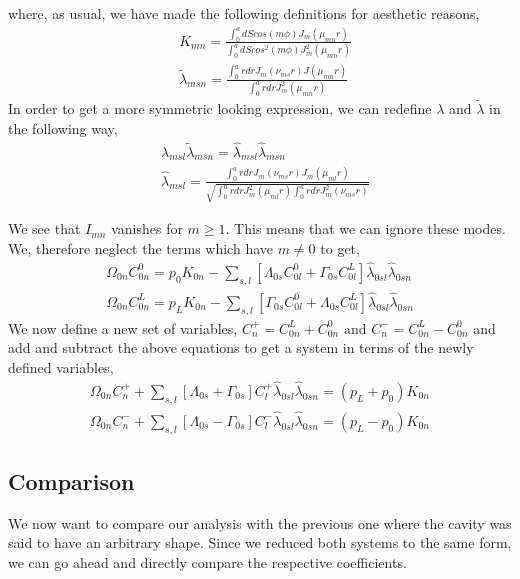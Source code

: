 where, as usual, we have made the following definitions for aesthetic reasons,
\begin{align}
 &K_{mn}=\frac{\int^a_0 dS cos(m\phi)J_m(\mu_{mn}r)}{\int^a_0 dS cos^2(m\phi)J^2_m(\mu_{mn}r)}\\
 &\widetilde{\lambda}_{msn}=\frac{\int^a_0 rdr J_m(\nu_{ms}r)J(\mu_{mn}r)}{\int^a_0 rdrJ^2_m(\mu_{mn}r)}
\end{align}
In order to get a more symmetric looking expression, we can redefine $\lambda$ and $\widetilde{\lambda}$
in the following way,
\begin{align}
 &\lambda_{msl}\widetilde{\lambda}_{msn}=\widehat{\lambda}_{msl}\widehat{\lambda}_{msn}\\
 &\widehat{\lambda}_{msl}=\frac{\int^a_0 rdrJ_m(\nu_{ms}r)J_m(\mu_{ml}r)}{\sqrt{\int^a_0 rdrJ^2_m(\mu_{ml}r)\int^a_0 rdrJ^2_m(\nu_{ms}r)}}
\end{align}

We see that $I_{mn}$ vanishes for $m\geq1$. This means that we can ignore these modes. We, therefore neglect
the terms which have $m\neq 0$ to get,
\begin{align}
 \Omega_{0n}C^0_{0n}=p_0K_{0n}-\sum_{s,l}\left[\Lambda_{0s}C^0_{0l}+\Gamma_{0s}C^L_{0l}\right]\widehat{\lambda}_{0sl}\widehat{\lambda}_{0sn}\\
 \Omega_{0n}C^L_{0n}=p_LK_{0n}-\sum_{s,l}\left[\Gamma_{0s}C^0_{0l}+\Lambda_{0s}C^L_{0l}\right]\widehat{\lambda}_{0sl}\widehat{\lambda}_{0sn}
\end{align}
We now define a new set of variables, $C_n^+=C_{0n}^L+C_{0n}^0$ and $C_n^-=C_{0n}^L-C_{0n}^0$ and add and subtract the above
equations to get a system in terms of the newly defined variables,
\begin{align}
 \Omega_{0n}C^+_n+\sum_{s,l}\left[\Lambda_{0s}+\Gamma_{0s}\right]C^+_{l}\widehat{\lambda}_{0sl}\widehat{\lambda}_{0sn}=(p_L+p_0)K_{0n}\\
 \Omega_{0n}C^-_n+\sum_{s,l}\left[\Lambda_{0s}-\Gamma_{0s}\right]C^-_{l}\widehat{\lambda}_{0sl}\widehat{\lambda}_{0sn}=(p_L-p_0)K_{0n}
\end{align}

\subsection{Comparison}
We now want to compare our analysis with the previous one where the cavity was said to 
have an arbitrary shape. Since we reduced both systems to the same form, we can go ahead
and directly compare the respective coefficients.
